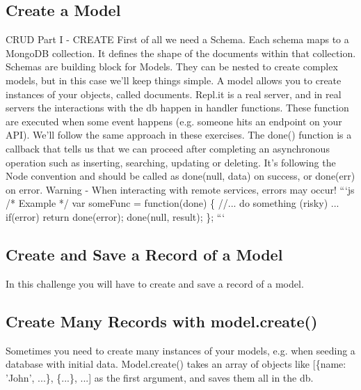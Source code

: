 \documentclass{article}%
\begin{document}
%
\subsection{Create a Model}%
\label{subsec:CreateaModel}%
CRUD Part I {-} CREATE\newline%
First of all we need a Schema. Each schema maps to a MongoDB collection. It defines the shape of the documents within that collection.\newline%
Schemas are building block for Models. They can be nested to create complex models, but in this case we’ll keep things simple.\newline%
A model allows you to create instances of your objects, called documents.\newline%
Repl.it is a real server, and in real servers the interactions with the db happen in handler functions. These function are executed when some event happens (e.g. someone hits an endpoint on your API). We’ll follow the same approach in these exercises. The done() function is a callback that tells us that we can proceed after completing an asynchronous operation such as inserting, searching, updating or deleting. It’s following the Node convention and should be called as done(null, data) on success, or done(err) on error.\newline%
Warning {-} When interacting with remote services, errors may occur!\newline%
```js\newline%
/* Example */\newline%
var someFunc = function(done) \{\newline%
  //... do something (risky) ...\newline%
  if(error) return done(error);\newline%
  done(null, result);\newline%
\};\newline%
```\newline%

%
\subsection{Create and Save a Record of a Model}%
\label{subsec:CreateandSaveaRecordofaModel}%
In this challenge you will have to create and save a record of a model.\newline%

%
\subsection{Create Many Records with model.create()}%
\label{subsec:CreateManyRecordswithmodel.create()}%
Sometimes you need to create many instances of your models, e.g. when seeding a database with initial data. Model.create() takes an array of objects like {[}\{name: 'John', ...\}, \{...\}, ...{]} as the first argument, and saves them all in the db.\newline%
\end{document}
